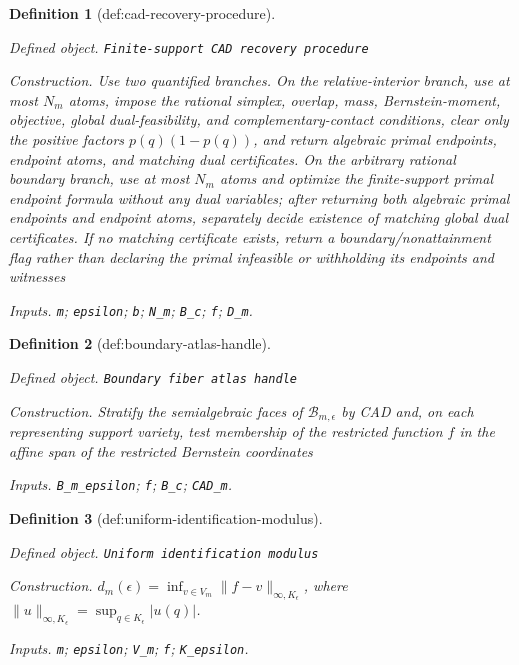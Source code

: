 \documentclass{article}
\newtheorem{definition}{Definition}
\begin{document}
\begin{definition}[def:cad-recovery-procedure]\label{def:cad-recovery-procedure}
\par\smallskip\noindent\emph{Defined object.} \texttt{Finite-\allowbreak{}support CAD recovery procedure}
\par\smallskip\noindent\emph{Construction.} Use two quantified branches. On the relative-interior branch, use at most \(N_m\) atoms, impose the rational simplex, overlap, mass, Bernstein-moment, objective, global dual-feasibility, and complementary-contact conditions, clear only the positive factors \(p(q)(1-p(q))\), and return algebraic primal endpoints, endpoint atoms, and matching dual certificates. On the arbitrary rational boundary branch, use at most \(N_m\) atoms and optimize the finite-support primal endpoint formula without any dual variables; after returning both algebraic primal endpoints and endpoint atoms, separately decide existence of matching global dual certificates. If no matching certificate exists, return a boundary/nonattainment flag rather than declaring the primal infeasible or withholding its endpoints and witnesses
\par\smallskip\noindent\emph{Inputs.} \texttt{m}; \texttt{epsilon}; \texttt{b}; \texttt{N\_\allowbreak{}m}; \texttt{B\_\allowbreak{}c}; \texttt{f}; \texttt{D\_\allowbreak{}m}.
\end{definition}

\begin{definition}[def:boundary-atlas-handle]\label{def:boundary-atlas-handle}
\par\smallskip\noindent\emph{Defined object.} \texttt{Boundary fiber atlas handle}
\par\smallskip\noindent\emph{Construction.} Stratify the semialgebraic faces of \(\mathcal B_{m,\epsilon}\) by CAD and, on each representing support variety, test membership of the restricted function \(f\) in the affine span of the restricted Bernstein coordinates
\par\smallskip\noindent\emph{Inputs.} \texttt{B\_\allowbreak{}m\_\allowbreak{}epsilon}; \texttt{f}; \texttt{B\_\allowbreak{}c}; \texttt{CAD\_\allowbreak{}m}.
\end{definition}

\begin{definition}[def:uniform-identification-modulus]\label{def:uniform-identification-modulus}
\par\smallskip\noindent\emph{Defined object.} \texttt{Uniform identification modulus}
\par\smallskip\noindent\emph{Construction.} \(d_m(\epsilon)=\inf_{v\in V_m}\|f-v\|_{\infty,K_{\epsilon}}\), where \(\|u\|_{\infty,K_{\epsilon}}=\sup_{q\in K_{\epsilon}}|u(q)|\).
\par\smallskip\noindent\emph{Inputs.} \texttt{m}; \texttt{epsilon}; \texttt{V\_\allowbreak{}m}; \texttt{f}; \texttt{K\_\allowbreak{}epsilon}.
\end{definition}
\end{document}
